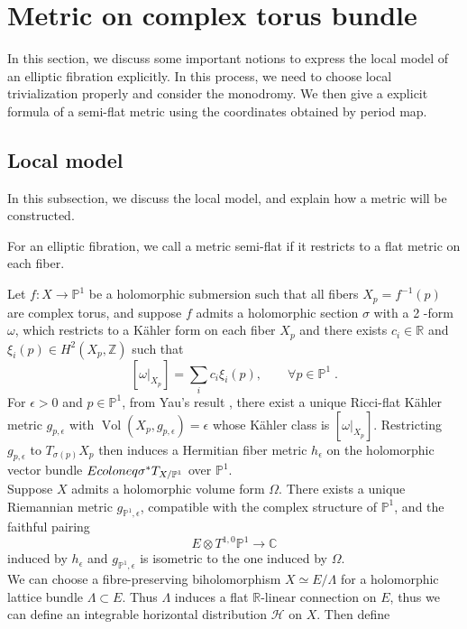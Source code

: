 
\section{Metric on complex torus bundle}
In this section, we discuss some important notions to express the local model of an elliptic fibration explicitly. In this process, we need to choose local trivialization properly and consider the monodromy. We then give a explicit formula of a semi-flat metric using the coordinates obtained by period map.
\subsection{Local model}
In this subsection, we discuss the local model, and explain how a metric will be constructed.
\begin{definition}
For an elliptic fibration, we call a metric semi-flat
if it restricts to a flat metric on each fiber.
\end{definition}
Let $f\colon X\rightarrow \mathbb{P}^1$ be a holomorphic submersion such that all fibers $X_p=f^{-1}(p)$ are complex torus, and suppose $f$ admits a holomorphic section $\sigma$ with a 2
-form $\omega$, which restricts to a K{\"a}hler form on each fiber $X_p$ and there exists $c_i\in\mathbb{R}$ and $\xi_i(p)\in H^2(X_p,\mathbb{Z})$ such that
\[ [\omega|_{X_p}]=\sum_i c_i\xi_i(p),\qquad  \forall p\in\mathbb{P}^1 \;. \]
\indent For $\epsilon>0$ and $p\in\mathbb{P}^1$, from Yau's result \cite{yau1978ricci}, there exist a unique Ricci-flat K{\"a}hler metric $g_{p,\epsilon}$ with $\operatorname{Vol}(X_p,g_{p,\epsilon})=\epsilon$ whose K{\"a}hler class is $[\omega|_{X_p}]$. Restricting $g_{p,\epsilon}$ to $T_{\sigma(p)}X_p$ then induces a Hermitian fiber metric $h_\epsilon$ on the holomorphic vector bundle $E\\coloneq \sigma^*T_{X/\mathbb{P}^1}$ over $\mathbb{P}^1$.\\ \indent
Suppose $X$ admits a holomorphic volume form $\Omega$. There exists a unique Riemannian metric $g_{\mathbb{P}^1,\epsilon}$, compatible with the complex structure of $\mathbb{P}^1$, and the faithful pairing 
\[ E\otimes T^{1,0}\mathbb{P}^1\rightarrow \mathbb{C} \]
induced by $h_\epsilon$ and $g_{\mathbb{P}^1,\epsilon}$ is isometric to the one induced by $\Omega$.\\ \indent
We can choose a fibre-preserving biholomorphism $X\simeq E/\Lambda$ for a holomorphic lattice bundle $\Lambda\subset E$. Thus $\Lambda$ induces a flat $\mathbb{R}$-linear connection on $E$, thus we can define an integrable horizontal distribution $\mathscr{H}$ on $X$. Then define
